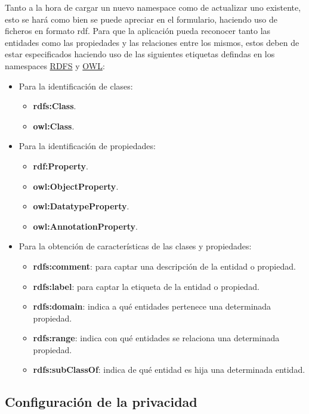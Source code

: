 Tanto a la hora de cargar un nuevo namespace como de actualizar uno existente,
esto se hará como bien se puede apreciar en el formulario, haciendo uso de
ficheros en formato rdf. Para que la aplicación pueda reconocer tanto las
entidades como las propiedades y las relaciones entre los mismos, estos deben de
estar especificados haciendo uso de las siguientes etiquetas defindas en los
namespaces \href{http://www.w3.org/TR/rdf-schema/}{RDFS} y
\href{http://www.w3.org/TR/owl-ref/}{OWL}:
\begin{itemize}
    \item Para la identificación de clases:
    \begin{itemize}
        \item \textbf{rdfs:Class}.
        \item \textbf{owl:Class}.
    \end{itemize}
    \item Para la identificación de propiedades:
    \begin{itemize}
        \item \textbf{rdf:Property}.
        \item \textbf{owl:ObjectProperty}.
        \item \textbf{owl:DatatypeProperty}.
        \item \textbf{owl:AnnotationProperty}.
    \end{itemize}
    \item Para la obtención de características de las clases y propiedades:
    \begin{itemize}
        \item \textbf{rdfs:comment}: para captar una descripción de la entidad o
            propiedad.
        \item \textbf{rdfs:label}: para captar la etiqueta de la entidad o
            propiedad.
        \item \textbf{rdfs:domain}: indica a qué entidades pertenece una
            determinada propiedad.
        \item \textbf{rdfs:range}: indica con qué entidades se relaciona una
            determinada propiedad.
        \item \textbf{rdfs:subClassOf}: indica de qué entidad es hija una
            determinada entidad.
    \end{itemize}
\end{itemize}

\subsection{Configuración de la privacidad}

